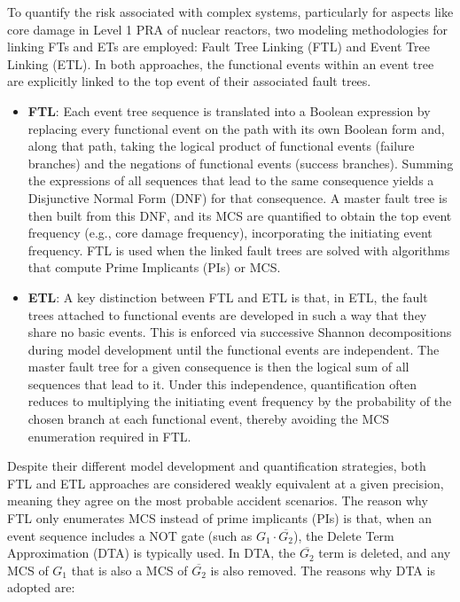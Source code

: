 To quantify the risk associated with complex systems, particularly for aspects like core damage in Level 1 PRA of nuclear reactors, two modeling methodologies for linking FTs and ETs are employed: Fault Tree Linking (FTL) and Event Tree Linking (ETL). In both approaches, the functional events within an event tree are explicitly linked to the top event of their associated fault trees.

\begin{itemize}
\item \textbf{FTL}: Each event tree sequence is translated into a Boolean expression by replacing every functional event on the path with its own Boolean form and, along that path, taking the logical product of functional events (failure branches) and the negations of functional events (success branches). Summing the expressions of all sequences that lead to the same consequence yields a Disjunctive Normal Form (DNF) for that consequence. A master fault tree is then built from this DNF, and its MCS are quantified to obtain the top event frequency (e.g., core damage frequency), incorporating the initiating event frequency. FTL is used when the linked fault trees are solved with algorithms that compute Prime Implicants (PIs) or MCS.

\item \textbf{ETL}: A key distinction between FTL and ETL is that, in ETL, the fault trees attached to functional events are developed in such a way that they share no basic events. This is enforced via successive Shannon decompositions during model development until the functional events are independent. The master fault tree for a given consequence is then the logical sum of all sequences that lead to it. Under this independence, quantification often reduces to multiplying the initiating event frequency by the probability of the chosen branch at each functional event, thereby avoiding the MCS enumeration required in FTL.
\end{itemize}

Despite their different model development and quantification strategies, both FTL and ETL approaches are considered weakly equivalent at a given precision, meaning they agree on the most probable accident scenarios. The reason why FTL only enumerates MCS instead of prime implicants (PIs) is that, when an event sequence includes a NOT gate (such as $G_1 \cdot \overline{G_2}$), the Delete Term Approximation (DTA) is typically used. In DTA, the \(\overline{G_2}\) term is deleted, and any MCS of \(G_1\) that is also a MCS of $\overline{G_2}$ is also removed. The reasons why DTA is adopted are:

